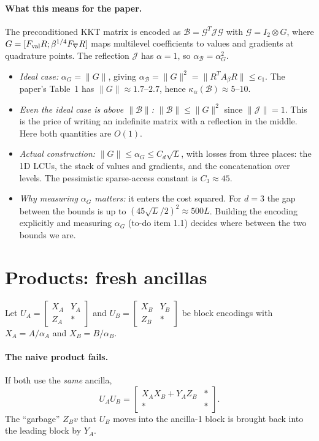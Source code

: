 \documentclass[11pt,a4paper]{article}
\newcommand{\B}{\mathcal{B}}
\newcommand{\G}{\mathcal{G}}
\newcommand{\J}{\mathcal{J}}
\begin{document}
\paragraph{What this means for the paper.} The preconditioned KKT matrix is
encoded as $\B=\G^T\J\G$ with $\G=I_2\otimes G$, where
$G=[F_{\rm val}R;\beta^{1/4}F_\nabla R]$ maps multilevel coefficients to values and
gradients at quadrature points. The reflection $\J$ has $\alpha=1$, so
$\alpha_\B=\alpha_G^2$.
\begin{itemize}
\item \emph{Ideal case:} $\alpha_G=\|G\|$, giving $\alpha_\B=\|G\|^2=\|R^TA_\beta R\|\le c_1$. The paper's
  Table~1 has $\|G\|\approx1.7$--$2.7$, hence $\kappa_\alpha(\B)\approx5$--$10$.
\item \emph{Even the ideal case is above $\|\B\|$:} $\|\B\|\le\|G\|^2$ since $\|\J\|=1$. This
  is the price of writing an indefinite matrix with a reflection in the
  middle. Here both quantities are $O(1)$.
\item \emph{Actual construction:} $\|G\|\le\alpha_G\le C_d\sqrt L$, with losses from three
  places: the 1D LCUs, the stack of values and gradients, and the
  concatenation over levels. The pessimistic sparse-access constant is
  $C_3\approx45$.
\item \emph{Why measuring $\alpha_G$ matters:} it enters the cost squared. For $d=3$
  the gap between the bounds is up to $(45\sqrt L/2)^2\approx500L$. Building the
  encoding explicitly and measuring $\alpha_G$ (to-do item 1.1) decides where
  between the two bounds we are.
\end{itemize}

\section{Products: fresh ancillas}\label{sec:prod}

Let $U_A=\begin{bmatrix}X_A&Y_A\\Z_A&*\end{bmatrix}$ and $U_B=\begin{bmatrix}X_B&Y_B\\Z_B&*\end{bmatrix}$
be block encodings with $X_A=A/\alpha_A$ and $X_B=B/\alpha_B$.

\paragraph{The naive product fails.} If both use the \emph{same} ancilla,
\[
U_AU_B=\begin{bmatrix}X_AX_B+Y_AZ_B & *\\ * & *\end{bmatrix}.
\]
The ``garbage'' $Z_Bv$ that $U_B$ moves into the ancilla-1 block is
brought back into the leading block by $Y_A$.
\end{document}
